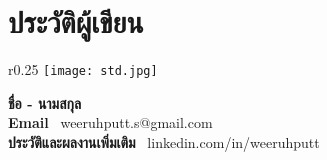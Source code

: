 \chapter{ประวัติผู้เขียน}
\begin{wrapfigure}{r}{0.25\textwidth}
	\vspace{-55pt}
	\centering
	\texttt{[image: std.jpg]}
\end{wrapfigure}

\noindent \textbf{ชื่อ - นามสกุล} \ \AuName \\
\textbf{Email} \ weeruhputt.s@gmail.com \\
\textbf{ประวัติและผลงานเพิ่มเติม} \ linkedin.com/in/weeruhputt \\

